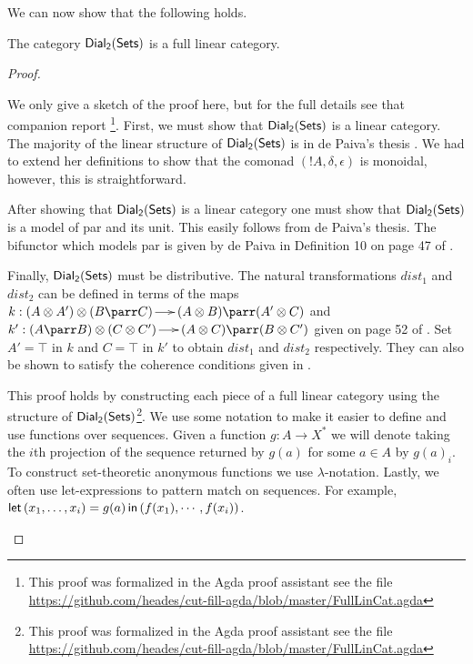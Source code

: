 We can now show that the following holds.
\begin{lemma}
  \label{lemma:ddial_is_a_linear_category}
  The category $\mathsf{Dial_2}(\mathsf{Sets})$ is a full linear category.
\end{lemma}
\begin{proof}
  \begin{paper}
    We only give a sketch of the proof here, but for the full details
    see that companion report \cite{Eades:2015}\footnote{This proof
      was formalized in the Agda proof assistant see the file
      \url{https://github.com/heades/cut-fill-agda/blob/master/FullLinCat.agda}}. First,
    we must show that $\mathsf{Dial_2}(\mathsf{Sets})$ is a linear category.  The majority of
    the linear structure of $\mathsf{Dial_2}(\mathsf{Sets})$ is in de Paiva's thesis
    \cite{dePaiva:1988}.  We had to extend her definitions to show
    that the comonad $(!A,\delta,\epsilon)$ is monoidal, however, this
    is straightforward.

    After showing that $\mathsf{Dial_2}(\mathsf{Sets})$ is a linear category one must show that
    $\mathsf{Dial_2}(\mathsf{Sets})$ is a model of par and its unit.  This easily follows from
    de Paiva's thesis.  The bifunctor which models par is given by de
    Paiva in Definition 10 on page 47 of \cite{dePaiva:1988}.

    Finally, $\mathsf{Dial_2}(\mathsf{Sets})$ must be distributive.  The natural
    transformations $dist_1$ and $dist_2$ can be defined in terms of
    the maps $k : (A \otimes A') \otimes (B \parr C) \to (A \otimes B)
    \parr (A' \otimes C)$ and $k' : (A \parr B) \otimes (C \otimes C')
    \to (A \otimes C) \parr (B \otimes C')$ given on page 52 of
    \cite{dePaiva:1988}.  Set $A' = \top$ in $k$ and $C = \top$ in
    $k'$ to obtain $dist_1$ and $dist_2$ respectively.  They can also
    be shown to satisfy the coherence conditions given in
    \cite{Cockett:1997}.
  \end{paper}
\begin{report}
  This proof holds by constructing each piece of a full linear
  category using the structure of $\mathsf{Dial_2}(\mathsf{Sets})$\footnote{This proof was
    formalized in the Agda proof assistant see the file
    \url{https://github.com/heades/cut-fill-agda/blob/master/FullLinCat.agda}}.
  We use some notation to make it easier to define and use functions
  over sequences.  Given a function $g : A \to X^*$ we will denote
  taking the $i$th projection of the sequence returned by $g(a)$ for
  some $a \in A$ by $g(a)_i$.  To construct set-theoretic anonymous
  functions we use $\lambda$-notation.  Lastly, we often use
  let-expressions to pattern match on sequences.  For example, $\mathsf{let}\,
  (x_1,\ldots,x_i) = g(a) \,\mathsf{in}\, (f(x_1),\cdots,f(x_i))$.
    

\end{report}
\end{proof}
